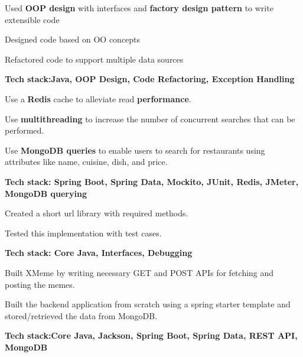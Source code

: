 \documentclass[]{deedy-resume-openfont}
\begin{document}
\begin{minipage}[t]{0.66\textwidth}
\descript{ \href{}{}}

\begin{tightemize}
\item Used \textbf{OOP design} with interfaces and \textbf{factory design pattern } to write extensible code
\item Designed code based on OO concepts
\item Refactored code to support multiple data sources
\item \textbf{Tech stack:Java, OOP Design, Code Refactoring, Exception Handling}
\end{tightemize}

\descript{ \href{}{}}

\begin{tightemize}
\item Use a \textbf{Redis} cache to alleviate read \textbf{performance}.
\item Use \textbf{multithreading} to increase the number of concurrent searches that can be performed.
\item Use \textbf{MongoDB queries} to enable users to search for restaurants using attributes like name, cuisine, dish, and price.

\item \textbf{Tech stack: Spring Boot, Spring Data, Mockito, JUnit, Redis, JMeter, MongoDB querying}
\end{tightemize}


\descript{ \href{}{}}

\begin{tightemize}
\item Created a short url library with required methods.
\item Tested this implementation with test cases.
\item \textbf{Tech stack: Core Java, Interfaces, Debugging}
\end{tightemize}



\descript{ \href{}{}}

\begin{tightemize}
\item Built XMeme by writing necessary GET and POST APIs for fetching and posting the memes.
\item Built the backend application from scratch using a spring starter template and stored/retrieved the data from MongoDB.
\item \textbf{Tech stack:Core Java, Jackson, Spring Boot, Spring Data, REST API, MongoDB}
\end{tightemize}



\end{minipage}
\end{document}
